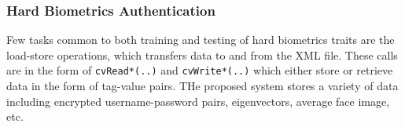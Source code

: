 \documentclass[12pt]{article}			%
\begin{document}

\begin{figure}
	\centering
	\quad
\end{figure}
\subsubsection{ Hard Biometrics Authentication }

Few tasks common to both training and testing of hard biometrics traits are the load-store operations, which transfers data to and from the XML file.
These calls are in the form of \verb+cvRead*(..)+ and \verb+cvWrite*(..)+ which either store or retrieve data in the form of tag-value pairs.
THe proposed system stores a variety of data including encrypted username-password pairs, eigenvectors, average face image, etc. 
\end{document}
